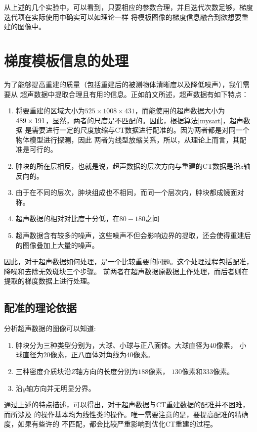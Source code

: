 从上述的几个实验中，可以看到，只要相应的参数合理，并且迭代次数足够，梯度迭代项在实际使用中确实可以如理论一样
将模板图像的梯度信息融合到欲想要重建的图像中。



\section{梯度模板信息的处理}
为了能够提高重建的质量（包括重建后的被测物体清晰度以及降低噪声），我们需要从
超声数据中提取合理且有用的信息。正如前文所述，超声数据有如下特点：
\begin{enumerate}
\item 将要重建的区域大小为$525\times1008\times431$，而能使用的超声数据大小为
$489\times191\time498$，显然，两者的尺度是不匹配的。因此，根据算法\ref{mysart}，超声数据
是需要进行一定的尺度放缩与CT数据进行配准的。因为两者都是对同一个物体模型进行探测，因此
两者为线型放缩关系，所以，从理论上而言，其配准是可行的。
\item 肿块的所在层相反，也就是说，超声数据的层次方向与重建的CT数据是沿$z$轴反向的。
\item 由于在不同的层次，肿块组成也不相同，而同一个层次内，肿块都成镜面对称。
\item 超声数据的相对对比度十分低，在$80-180$之间
\item 超声数据含有较多的噪声，这些噪声不但会影响边界的提取，还会使得重建后的图像叠加上大量的噪声。
\end{enumerate}

因此，对于超声数据如何处理，是一个比较重要的问题。这个处理过程包括配准，降噪和去除无效斑块三个步骤。
前两者在超声数据原数据上作处理，而后者则在提取的梯度数据上进行处理。
\subsection{配准的理论依据}
分析超声数据的图像可以知道:
\begin{enumerate}
\item 肿块分为三种类型分别为，大球、小球与正八面体。大球直径为$40$像素，
小球直径为$20$像素，正八面体对角线为$40$像素。
\item 三种密度介质块沿$Z$轴方向的长度分别为$188$像素，
$130$像素和$333$像素。
\item 沿$y$轴方向并无明显分界。
\end{enumerate}

通过上述的特点描述，可以得出，对于超声数据与CT重建数据的配准并不困难，而所涉及
的操作基本均为线性类的操作。唯一需要注意的是，要提高配准的精确度，如果有些许的
不匹配，都会比较严重影响到优化CT重建的过程。

